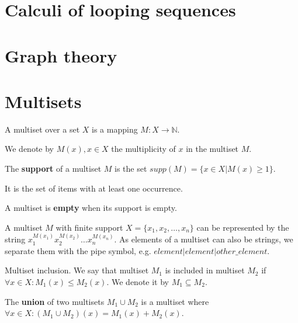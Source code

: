 
\section{Calculi of looping sequences} %
\label{sec:calculi_of_looping_sequences}


\section{Graph theory} %
\label{sec:graph_theory}


\section{Multisets} %
\label{sec:multisets}

\begin{definition}
A multiset over a set $X$ is a mapping $M: X\rightarrow \mathbb N$.
\end{definition}

We denote by $M(x), x\in X$ the multiplicity of $x$ in the multiset $M$.

\begin{definition}
The {\bf support} of a multiset $M$ is the set $supp(M)=\{x\in X|M(x)\geq 1\}$.
\end{definition}

It is the set of items with at least one occurrence.

\begin{definition}
A multiset is {\bf empty} when its support is empty.
\end{definition}

A multiset $M$ with finite support $X = \{x_1, x_2, \dots, x_n\}$ can be represented by the string $x_1^{M(x_1)}x_2^{M(x_2)}\dots x_n^{M(x_n)}$.
As elements of a multiset can also be strings, we separate them with the pipe symbol, e.g. $element|element|other\_element$.

\begin{definition}
Multiset inclusion. We say that multiset $M_1$ is included in multiset $M_2$ if $\forall x \in X: M_1(x)\leq M_2(x)$. We denote it by $M_1\subseteq M_2$.
\end{definition}

\begin{definition}
The {\bf union} of two multisets $M_1\cup M_2$ is a multiset where $\forall x \in X: (M_1\cup M_2)(x)=M_1(x)+M_2(x)$.
\end{definition}

